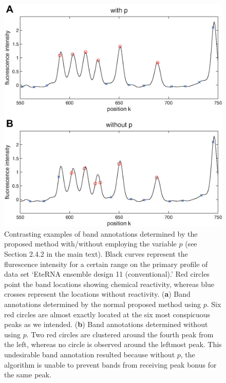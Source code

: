 \documentclass[letter]{bioinfo}
\newcommand{\hilightcolor}{red}
\newcommand{\hilight}[1]{{\color{\hilightcolor}#1}}
\begin{document}
\begin{figure}
\centering
\includegraphics[width=\linewidth]{figures/FigureS2}
\caption{\hilight{Contrasting examples of band annotations determined by the proposed method with/without employing the variable $p$ (see Section 2.4.2 in the main text). Black curves represent the flurescence intensity for a certain range on the primary profile of data set `EteRNA ensemble design 11 (conventional).' Red circles point the band locations showing chemical reactivity, whereas blue crosses represent the locations without reactivity. (\textbf{a}) Band annotations determined by the normal proposed method using $p$. Six red circles are almost exactly located at the six most conspicuous peaks as we intended. (\textbf{b}) Band annotations determined without using $p$. Two red circles are clustered around the fourth peak from the left, whereas no circle is observed around the leftmost peak. This undesirable band annotation resulted because without $p$, the algorithm is unable to prevent bands from receiving peak bonus for the same peak.}}
\label{f:with_without_p}
\end{figure}
\end{document}
